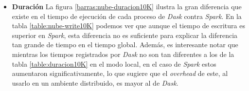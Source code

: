 \begin{itemize}
	\item \textbf{Duración} La figura \ref{barras:nube-duracion10K} ilustra la gran diferencia que existe en el tiempo de ejecución de cada proceso de \textit{Dask} contra \textit{Spark}. En la tabla \ref{table:nube-write10K} podemos ver que aunque el tiempo de escritura es superior en \textit{Spark}, esta diferencia no es suficiente para explicar la diferencia tan grande de tiempo en el tiempo global. Además, es interesante notar que mientras los tiempos registrados por \textit{Dask} no son tan diferentes a los de la tabla \ref{table:duracion10K} en el modo local, en el caso de \textit{Spark} estos aumentaron significativamente, lo que sugiere que el \textit{overhead} de este, al usarlo en un ambiente distribuido, es mayor al de \textit{Dask}.
	
\end{itemize}



